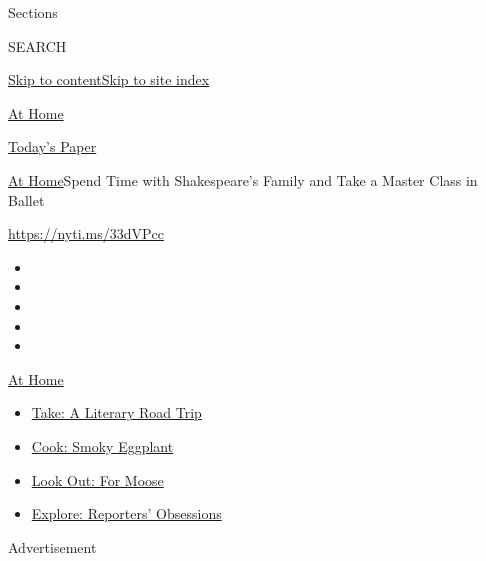 Sections

SEARCH

\protect\hyperlink{site-content}{Skip to
content}\protect\hyperlink{site-index}{Skip to site index}

\href{https://www.nytimes.com/spotlight/at-home}{At Home}

\href{https://myaccount.nytimes.com/auth/login?response_type=cookie\&client_id=vi}{}

\href{https://www.nytimes.com/section/todayspaper}{Today's Paper}

\href{/spotlight/at-home}{At Home}\textbar{}Spend Time with
Shakespeare's Family and Take a Master Class in Ballet

\url{https://nyti.ms/33dVPcc}

\begin{itemize}
\item
\item
\item
\item
\item
\end{itemize}

\href{https://www.nytimes.com/spotlight/at-home?action=click\&pgtype=Article\&state=default\&region=TOP_BANNER\&context=at_home_menu}{At
Home}

\begin{itemize}
\tightlist
\item
  \href{https://www.nytimes.com/2020/07/28/books/time-for-a-literary-road-trip.html?action=click\&pgtype=Article\&state=default\&region=TOP_BANNER\&context=at_home_menu}{Take:
  A Literary Road Trip}
\item
  \href{https://www.nytimes.com/2020/07/29/magazine/bored-with-your-home-cooking-some-smoky-eggplant-will-fix-that.html?action=click\&pgtype=Article\&state=default\&region=TOP_BANNER\&context=at_home_menu}{Cook:
  Smoky Eggplant}
\item
  \href{https://www.nytimes.com/2020/07/27/travel/moose-michigan-isle-royale.html?action=click\&pgtype=Article\&state=default\&region=TOP_BANNER\&context=at_home_menu}{Look
  Out: For Moose}
\item
  \href{https://www.nytimes.com/interactive/2020/at-home/even-more-reporters-editors-diaries-lists-recommendations.html?action=click\&pgtype=Article\&state=default\&region=TOP_BANNER\&context=at_home_menu}{Explore:
  Reporters' Obsessions}
\end{itemize}

Advertisement

